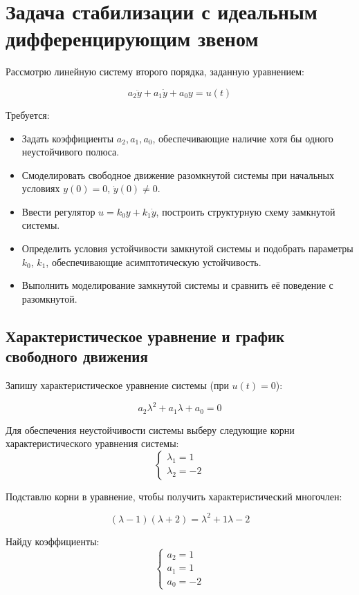 \documentclass[a4paper,12pt]{article}
\begin{document}
	\newpage
	\tableofcontents
	
	\newpage
	\section{Задача стабилизации с идеальным дифференцирующим звеном} \label{sec:task1}

	
	Рассмотрю линейную систему второго порядка, заданную уравнением:
	
	\[
	a_2 \ddot{y} + a_1 \dot{y} + a_0 y = u(t)
	\]
	
	Требуется:
	
	\begin{itemize}
		\item Задать коэффициенты \( a_2, a_1, a_0 \), обеспечивающие наличие хотя бы одного неустойчивого полюса.
		\item Смоделировать свободное движение разомкнутой системы при начальных условиях \( y(0) = 0 \), \( \dot{y}(0) \ne 0 \).
		\item Ввести регулятор \( u = k_0 y + k_1 \dot{y} \), построить структурную схему замкнутой системы.
		\item Определить условия устойчивости замкнутой системы и подобрать параметры \( k_0 \), \( k_1 \), обеспечивающие асимптотическую устойчивость.
		\item Выполнить моделирование замкнутой системы и сравнить её поведение с разомкнутой.
	\end{itemize}
	
	
	\subsection{Характеристическое уравнение и график свободного движения}
	
	Запишу характеристическое уравнение системы (при \( u(t) = 0 \)):
	
	\[
	a_2 \lambda^2 + a_1 \lambda + a_0 = 0
	\]
	
	Для обеспечения неустойчивости системы выберу следующие корни характеристического уравнения системы: 
	\[
	\begin{cases}
		\lambda_1 = 1 \\
		\lambda_2 = -2
	\end{cases}
	\]
	
	
	Подставлю корни в уравнение, чтобы получить характеристический многочлен:
	
	\[
	(\lambda - 1)(\lambda + 2) = \lambda^2 + 1\lambda - 2
	\]
	
	Найду коэффициенты:
	\[
	\begin{cases}
		a_2 = 1 \\
		a_1 = 1 \\
		a_0 = -2
	\end{cases}
	\]
	
\end{document}
